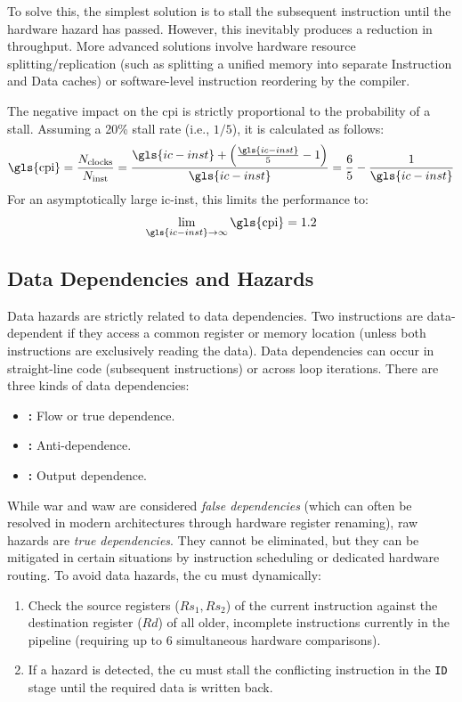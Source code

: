 To solve this, the simplest solution is to stall the subsequent instruction until the hardware hazard has passed. However, this inevitably produces a reduction in throughput. More advanced solutions involve hardware resource splitting/replication (such as splitting a unified memory into separate Instruction and Data caches) or software-level instruction reordering by the compiler. 

The negative impact on the \gls{cpi} is strictly proportional to the probability of a stall. Assuming a 20\% stall rate (i.e., $1/5$), it is calculated as follows:
\[
    \text{\gls{cpi}} = \frac{N_{\text{clocks}}}{N_{\text{inst}}} = \frac{\gls{ic-inst} + \left(\frac{\gls{ic-inst}}{5} - 1\right)}{\gls{ic-inst}} = \frac{6}{5} - \frac{1}{\gls{ic-inst}}
\]
For an asymptotically large \gls{ic-inst}, this limits the performance to:
\[
    \lim_{\gls{ic-inst} \to \infty} \text{\gls{cpi}} = 1.2
\]

\subsection{Data Dependencies and Hazards}
Data hazards are strictly related to data dependencies. Two instructions are data-dependent if they access a common register or memory location (unless both instructions are exclusively reading the data). Data dependencies can occur in straight-line code (subsequent instructions) or across loop iterations. There are three kinds of data dependencies:
\begin{itemize}
    \item \textbf{:} Flow or true dependence.
    \item \textbf{:} Anti-dependence.
    \item \textbf{:} Output dependence.
\end{itemize}

While \gls{war} and \gls{waw} are considered \textit{false dependencies} (which can often be resolved in modern architectures through hardware register renaming), \gls{raw} hazards are \textit{true dependencies}. They cannot be eliminated, but they can be mitigated in certain situations by instruction scheduling or dedicated hardware routing. To avoid data hazards, the \gls{cu} must dynamically:
\begin{enumerate}
    \item Check the source registers (\(Rs_1, Rs_2\)) of the current instruction against the destination register (\(Rd\)) of all older, incomplete instructions currently in the pipeline (requiring up to 6 simultaneous hardware comparisons).
    \item If a hazard is detected, the \gls{cu} must stall the conflicting instruction in the \texttt{ID} stage until the required data is written back.
\end{enumerate}

